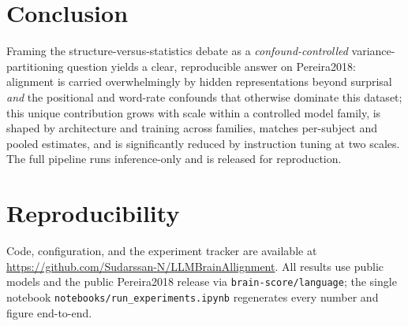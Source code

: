 \documentclass{article}
\begin{document}
\section{Conclusion}
\label{sec:conclusion}
Framing the structure-versus-statistics debate as a \emph{confound-controlled}
variance-partitioning question yields a clear, reproducible answer on Pereira2018: alignment is
carried overwhelmingly by hidden representations beyond surprisal \emph{and} the positional and
word-rate confounds that otherwise dominate this dataset; this unique contribution grows with
scale within a controlled model family, is shaped by architecture and training across families,
matches per-subject and pooled estimates, and is significantly reduced by instruction tuning at
two scales. The full pipeline runs inference-only and is released for reproduction.

\section*{Reproducibility}
Code, configuration, and the experiment tracker are available at
\url{https://github.com/Sudarssan-N/LLMBrainAllignment}. All results use public models and the
public Pereira2018 release via \texttt{brain-score/language}; the single notebook
\texttt{notebooks/run\_experiments.ipynb} regenerates every number and figure end-to-end.



\end{document}
